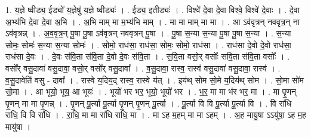 \documentclass[17pt]{extarticle}
\begin{document}
1. य॒ज्ञे ष्वीड्य॒ ईड्यो॑ य॒ज्ञेषु॑ य॒ज्ञे ष्वीड्यः॑ । . ईड्य॒ इतीड्यः॑ । . विश्वे॑ दे॒वा दे॒वा विश्वे॒ विश्वे॑ दे॒वाः । . दे॒वा अ॒भ्य॑भि दे॒वा दे॒वा अ॒भि । . अ॒भि माम् मा म॒भ्य॑भि माम् । . मा मा माम् मा मा । . आ ऽव॑वृत्रन् नववृत्र॒न् ना ऽव॑वृत्रन्न् । . अ॒व॒वृ॒त्र॒न् पू॒षा पू॒षा ऽव॑वृत्रन् नववृत्रन् पू॒षा । . पू॒षा स॒न्या स॒न्या पू॒षा पू॒षा स॒न्या । . स॒न्या सोमः॒ सोमः॑ स॒न्या स॒न्या सोमः॑ । . सोमो॒ राध॑सा॒ राध॑सा॒ सोमः॒ सोमो॒ राध॑सा । . राध॑सा दे॒वो दे॒वो राध॑सा॒ राध॑सा दे॒वः । . दे॒वः स॑वि॒ता स॑वि॒ता दे॒वो दे॒वः स॑वि॒ता । . स॒वि॒ता वसो॒र् वसोः᳚ सवि॒ता स॑वि॒ता वसोः᳚ । . वसो᳚र् वसु॒दावा॑ वसु॒दावा॒ वसो॒र् वसो᳚र् वसु॒दावा᳚ । . व॒सु॒दावा॒ रास्व॒ रास्व॑ वसु॒दावा॑ वसु॒दावा॒ रास्व॑ । . व॒सु॒दावेति॑ वसु - दावा᳚ । . रास्वे य॒दिय॒द् रास्व॒ रास्वे य॑त् । . इय॑थ् सोम सो॒मे य॒दिय॑थ् सोम । . सो॒मा सो॑म सो॒मा । . आ भूयो॒ भूय॒ आ भूयः॑ । . भूयो॑ भर भर॒ भूयो॒ भूयो॑ भर । . भ॒र॒ मा मा भ॑र भर॒ मा । . मा पृ॒णन् पृ॒णन् मा मा पृ॒णन्न् । . पृ॒णन् पू॒र्त्या पू॒र्त्या पृ॒णन् पृ॒णन् पू॒र्त्या । . पू॒र्त्या वि वि पू॒र्त्या पू॒र्त्या वि । . वि रा॑धि राधि॒ वि वि रा॑धि । . रा॒धि॒ मा मा रा॑धि राधि॒ मा । . मा ऽह म॒हम् मा मा ऽहम् । . अ॒ह मायु॒षा ऽऽयु॑षा॒ ऽह म॒ह मायु॑षा । \newline
\end{document}
